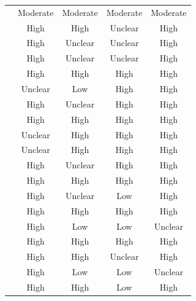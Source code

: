 \documentclass[a4paper,fleqn]{cas-sc}
\begin{document}
\begin{longtable}{|l|c|c|c|c|}
\citet{61Karsenti202027} & Moderate & Moderate & Moderate & Moderate \\
\citet{62Milosz201896} & High & High & Unclear & High \\
\citet{63Liu2021} & High & Unclear & Unclear & High \\
\citet{64Hsu201324} & High & Unclear & Unclear & High \\
\citet{65Razak201139} & High & High & High & High \\
\citet{66Rahmawati2023163} & Unclear & Low & High & High \\
\citet{67Lin201296} & High & Unclear & High & High \\
\citet{69Wong2017150} & High & High & High & High \\
\citet{70Hou201519} & Unclear & High & High & High \\
\citet{71lynch2015pedagogical} & Unclear & High & High & High \\
\citet{72hutauruk2020utilization} & High & Unclear & High & High \\
\citet{73Wolfartsberger2011160} & High & High & High & High \\
\citet{74Fendt2019} & High & Unclear & Low & High \\
\citet{75trajano2014using} & High & High & High & High \\
\citet{76Corbeil2011462} & High & Low & Low & Unclear \\
\citet{77Ramansyah2021} & High & High & High & High \\
\citet{78Rouse2022357} & High & High & Unclear & High \\
\citet{79Fernes2024379} & High & Low & Low & Unclear \\
\citet{80gottlieb2018your} & High & High & Low & High \\

\end{longtable}
\end{document}
